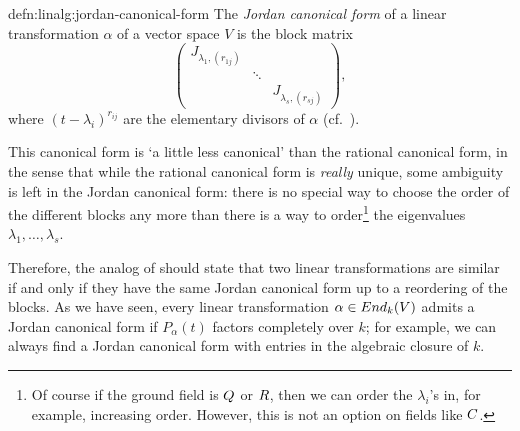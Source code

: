 \begin{defn}{}{defn:linalg:jordan-canonical-form}
  The \emph{Jordan canonical form} of a linear transformation $\alpha$
  of a vector space $V$ is the block matrix
  \[
    \begin{pmatrix}
      J_{\lambda_1, (r_{1j})} & & \\
                              & \ddots & \\
                              & & J_{\lambda_s, (r_{sj})}
    \end{pmatrix},
  \]
  where $(t - \lambda_i)^{r_{ij}}$ are the elementary divisors of
  $\alpha$ (cf.\ ).
\end{defn}

This canonical form is `a little less canonical' than the rational
canonical form, in the sense that while the rational canonical form is
\emph{really} unique, some ambiguity is left in the Jordan canonical
form: there is no special way to choose the order of the different
blocks any more than there is a way to order\footnote{Of course if the
  ground field is $Q$ or $R$, then we can order the $\lambda_i$'s
  in, for example, increasing order. However, this is not an option on
  fields like $C$.} the eigenvalues $\lambda_1, \dots, \lambda_s$.

Therefore, the analog of  should state that
two linear transformations are similar if and only if they have the
same Jordan canonical form up to a reordering of the blocks. As we
have seen, every linear transformation $\alpha \in End_k(V)$ admits a
Jordan canonical form if $P_\alpha(t)$ factors completely over $k$;
for example, we can always find a Jordan canonical form with entries
in the algebraic closure of $k$.

